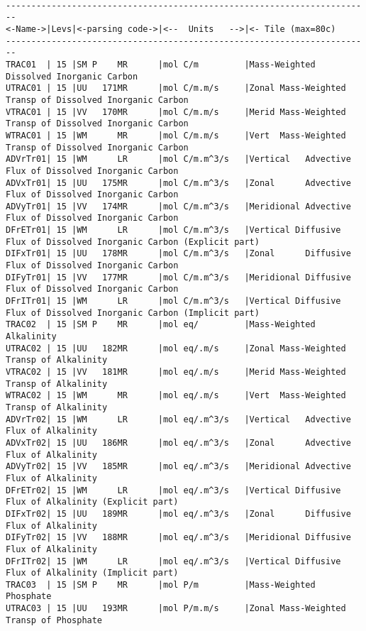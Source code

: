 {\footnotesize
\begin{verbatim}

------------------------------------------------------------------------
<-Name->|Levs|<-parsing code->|<--  Units   -->|<- Tile (max=80c) 
------------------------------------------------------------------------
TRAC01  | 15 |SM P    MR      |mol C/m         |Mass-Weighted Dissolved Inorganic Carbon
UTRAC01 | 15 |UU   171MR      |mol C/m.m/s     |Zonal Mass-Weighted Transp of Dissolved Inorganic Carbon
VTRAC01 | 15 |VV   170MR      |mol C/m.m/s     |Merid Mass-Weighted Transp of Dissolved Inorganic Carbon
WTRAC01 | 15 |WM      MR      |mol C/m.m/s     |Vert  Mass-Weighted Transp of Dissolved Inorganic Carbon
ADVrTr01| 15 |WM      LR      |mol C/m.m^3/s   |Vertical   Advective Flux of Dissolved Inorganic Carbon
ADVxTr01| 15 |UU   175MR      |mol C/m.m^3/s   |Zonal      Advective Flux of Dissolved Inorganic Carbon
ADVyTr01| 15 |VV   174MR      |mol C/m.m^3/s   |Meridional Advective Flux of Dissolved Inorganic Carbon
DFrETr01| 15 |WM      LR      |mol C/m.m^3/s   |Vertical Diffusive Flux of Dissolved Inorganic Carbon (Explicit part)
DIFxTr01| 15 |UU   178MR      |mol C/m.m^3/s   |Zonal      Diffusive Flux of Dissolved Inorganic Carbon
DIFyTr01| 15 |VV   177MR      |mol C/m.m^3/s   |Meridional Diffusive Flux of Dissolved Inorganic Carbon
DFrITr01| 15 |WM      LR      |mol C/m.m^3/s   |Vertical Diffusive Flux of Dissolved Inorganic Carbon (Implicit part)
TRAC02  | 15 |SM P    MR      |mol eq/         |Mass-Weighted Alkalinity
UTRAC02 | 15 |UU   182MR      |mol eq/.m/s     |Zonal Mass-Weighted Transp of Alkalinity
VTRAC02 | 15 |VV   181MR      |mol eq/.m/s     |Merid Mass-Weighted Transp of Alkalinity
WTRAC02 | 15 |WM      MR      |mol eq/.m/s     |Vert  Mass-Weighted Transp of Alkalinity
ADVrTr02| 15 |WM      LR      |mol eq/.m^3/s   |Vertical   Advective Flux of Alkalinity
ADVxTr02| 15 |UU   186MR      |mol eq/.m^3/s   |Zonal      Advective Flux of Alkalinity
ADVyTr02| 15 |VV   185MR      |mol eq/.m^3/s   |Meridional Advective Flux of Alkalinity
DFrETr02| 15 |WM      LR      |mol eq/.m^3/s   |Vertical Diffusive Flux of Alkalinity (Explicit part)
DIFxTr02| 15 |UU   189MR      |mol eq/.m^3/s   |Zonal      Diffusive Flux of Alkalinity
DIFyTr02| 15 |VV   188MR      |mol eq/.m^3/s   |Meridional Diffusive Flux of Alkalinity
DFrITr02| 15 |WM      LR      |mol eq/.m^3/s   |Vertical Diffusive Flux of Alkalinity (Implicit part)
TRAC03  | 15 |SM P    MR      |mol P/m         |Mass-Weighted Phosphate
UTRAC03 | 15 |UU   193MR      |mol P/m.m/s     |Zonal Mass-Weighted Transp of Phosphate

\end{verbatim}}
